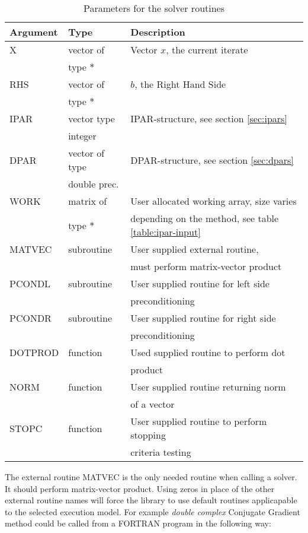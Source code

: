 \documentclass[11pt,a4paper,english,oneside]{report}
\begin{document}
\begin{table}[H]
\begin{tabular*}{\textwidth}{lll}
\hline\hline
{\bfseries Argument} & {\bfseries Type} & {\bfseries Description} \\
\hline
X	& vector of 		& Vector $x$, the current iterate \\
	& type $*$		& \\
RHS 	& vector of		& $b$, the Right Hand Side \\
	& type $*$		& \\
IPAR	& vector type		& IPAR-structure, see section \ref{sec:ipars} \\
	& integer		& \\
DPAR 	& vector of type	& DPAR-structure, see section \ref{sec:dpars} \\
	& double prec.		& \\
WORK 	& matrix of		& User allocated working array, size varies\\
	& type $*$		& depending on the method, see table \ref{table:ipar-input} \\
MATVEC 	& subroutine 		& User supplied external routine, \\
	&			& must perform matrix-vector product \\
PCONDL 	& subroutine 		& User supplied routine for left side \\
	&			& preconditioning \\
PCONDR 	& subroutine 		& User supplied routine for right side \\
	&			& preconditioning \\
DOTPROD	& function 		& Used supplied routine to perform dot \\
	&			& product \\
NORM 	& function 		& User supplied routine returning norm \\
	&			& of a vector \\
STOPC 	& function 		& User supplied routine to perform stopping\\
	&			& criteria testing \\
\hline\hline
\end{tabular*}
\caption{Parameters for the solver routines}
\label{table:solver-param}
\end{table}

The external routine {\ttfamily MATVEC} is the only needed routine when
calling a solver. It should perform matrix-vector product.
Using zeros in place of the other external routine names will force the
library to use default routines applicapable to the selected execution model.
For example {\em double complex} Conjugate Gradient method could be called
from a FORTRAN program in the following way:
\end{document}
